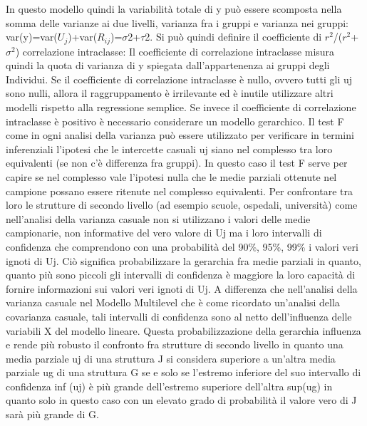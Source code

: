 \documentclass[a4page, 11pt]{article}
\begin{document}
In questo modello quindi la variabilità totale di y può essere scomposta nella somma delle varianze ai due livelli, varianza fra i gruppi e varianza nei gruppi: var(y)=var($U_j$)+var($R_{ij}$)=$\sigma$2+$\tau$2.
\newline
Si può quindi definire il coefficiente di $r^{2}$/($r^{2}$+$\sigma^{2}$)  correlazione intraclasse: 
\newline
Il coefficiente di correlazione intraclasse misura quindi la quota di varianza di y spiegata dall’appartenenza ai gruppi degli Individui. Se il coefficiente di correlazione intraclasse è nullo, ovvero tutti gli uj sono nulli, allora il raggruppamento è irrilevante ed è inutile utilizzare altri modelli rispetto alla regressione semplice. Se invece il coefficiente di correlazione intraclasse è positivo è necessario considerare un modello gerarchico.
\newline
Il test F come in ogni analisi della varianza può essere utilizzato per verificare in termini inferenziali l’ipotesi che le intercette casuali uj siano nel complesso tra loro equivalenti (se non c’è differenza fra gruppi). In questo caso il test F serve per capire se nel complesso vale l’ipotesi nulla che le medie parziali ottenute nel campione possano essere ritenute nel complesso equivalenti. Per confrontare tra loro le strutture di secondo livello (ad esempio scuole, ospedali, università) come nell’analisi della varianza casuale non si utilizzano i valori delle medie campionarie, non informative del vero valore di Uj ma i loro intervalli di confidenza che comprendono con una probabilità del 90\%, 95\%, 99\% i valori veri ignoti di Uj.
\newline
Ciò significa probabilizzare la gerarchia fra medie parziali in quanto, quanto più sono piccoli gli intervalli di confidenza è maggiore la loro capacità di fornire informazioni sui valori veri ignoti di Uj. A differenza che nell’analisi della varianza casuale nel Modello Multilevel che è come ricordato un’analisi della covarianza casuale, tali intervalli di confidenza sono al netto dell’influenza delle variabili X del modello lineare. Questa probabilizzazione della gerarchia influenza e rende più robusto il confronto fra strutture di secondo livello in quanto una media parziale uj di una struttura J si considera superiore a un’altra media parziale ug di una struttura G se e solo se l’estremo inferiore del suo intervallo di confidenza inf (uj) è più grande dell’estremo superiore dell’altra sup(ug) in quanto solo in questo caso con un elevato grado di probabilità il valore vero di J sarà più grande di G.
\end{document}
